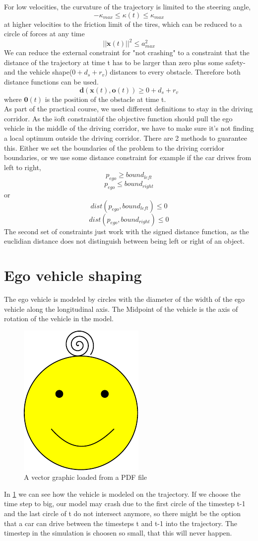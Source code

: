 \documentclass[conference]{IEEEtran}
\begin{document}
For low velocities, the curvature of the trajectory is limited to the steering angle,
$$ -\kappa_{max} \leq \kappa (t) \leq \kappa_{max}$$
at higher velocities to the friction limit of the tires, which can be reduced to a circle of forces at any time
$$
||\mathbf{\ddot{x}}(t)||^2 \leq a_{max}^2
$$
We can reduce the external constraint for "not crashing" to a constraint that the distance of the trajectory at time t has to be larger than zero plus some safety- and the vehicle shape($0+ d_s+ r_v $) distances to every obstacle. Therefore both distance functions can be used.
$$
\mathbf{d}(\mathbf{x}(t),\mathbf{o}(t)) \geq 0+ d_s + r_v$$
where $\mathbf{0}(t) $ is the position of the obstacle at time t.\\
As part of the practical course, we used different definitions to stay in the driving corridor. As the \"soft constraint\" of the objective function should pull the ego vehicle in the middle of the driving corridor, we have to make sure it's not finding a local optimum outside the driving corridor. There are 2 methods to guarantee this. Either we set the boundaries of the problem to the driving corridor boundaries, or we use some distance constraint for example if the car drives from left to right,
$$ p_{ego} \geq bound_{left}$$
$$ p_{ego} \leq bound_{right}$$
or 
$$ dist(p_{ego},bound_{left}) \leq 0 $$
$$ dist(p_{ego},bound_{right}) \leq 0 $$
The second set of constraints just work with the signed distance function, as the euclidian distance does not distinguish between being left or right of an object.
\section{Ego vehicle shaping}
The ego vehicle is modeled by circles with the diameter of the width of the ego vehicle along the longitudinal axis. The Midpoint of the vehicle is the axis of rotation of the vehicle in the model.
\begin{figure}[h]
\begin{center}
\includegraphics{./images/grins.pdf}
\end{center}
\caption{A vector graphic loaded from a PDF file}
\label{veh_shape}
\end{figure}
In \ref{veh_shape} we can see how the vehicle is modeled on the trajectory. If we choose the time step to big, our model may crash due to the first circle of the timestep t-1 and the last circle of t do not intersect anymore, so there might be the option that a car can drive between the timesteps t and t-1 into the trajectory. The timestep in the simulation is choosen so small, that this will never happen.
\end{document}
